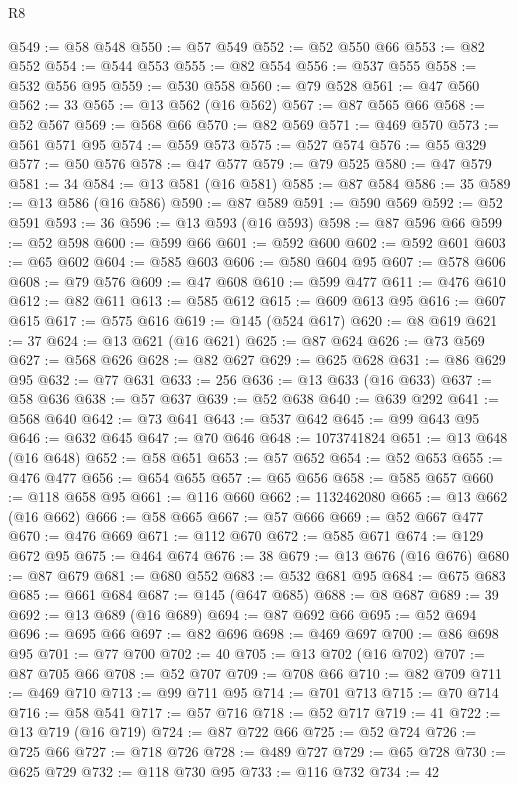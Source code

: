 \begin{lexlean}{R8}
\begin{coremodule}
@549 := @58 @548
@550 := @57 @549
@552 := @52 @550 @66
@553 := @82 @552
@554 := @544 @553
@555 := @82 @554
@556 := @537 @555
@558 := @532 @556 @95
@559 := @530 @558
@560 := @79 @528
@561 := @47 @560
@562 := 33
@565 := @13 @562 (@16 @562)
@567 := @87 @565 @66
@568 := @52 @567
@569 := @568 @66
@570 := @82 @569
@571 := @469 @570
@573 := @561 @571 @95
@574 := @559 @573
@575 := @527 @574
@576 := @55 @329
@577 := @50 @576
@578 := @47 @577
@579 := @79 @525
@580 := @47 @579
@581 := 34
@584 := @13 @581 (@16 @581)
@585 := @87 @584
@586 := 35
@589 := @13 @586 (@16 @586)
@590 := @87 @589
@591 := @590 @569
@592 := @52 @591
@593 := 36
@596 := @13 @593 (@16 @593)
@598 := @87 @596 @66
@599 := @52 @598
@600 := @599 @66
@601 := @592 @600
@602 := @592 @601
@603 := @65 @602
@604 := @585 @603
@606 := @580 @604 @95
@607 := @578 @606
@608 := @79 @576
@609 := @47 @608
@610 := @599 @477
@611 := @476 @610
@612 := @82 @611
@613 := @585 @612
@615 := @609 @613 @95
@616 := @607 @615
@617 := @575 @616
@619 := @145 (@524 @617)
@620 := @8 @619
@621 := 37
@624 := @13 @621 (@16 @621)
@625 := @87 @624
@626 := @73 @569
@627 := @568 @626
@628 := @82 @627
@629 := @625 @628
@631 := @86 @629 @95
@632 := @77 @631
@633 := 256
@636 := @13 @633 (@16 @633)
@637 := @58 @636
@638 := @57 @637
@639 := @52 @638
@640 := @639 @292
@641 := @568 @640
@642 := @73 @641
@643 := @537 @642
@645 := @99 @643 @95
@646 := @632 @645
@647 := @70 @646
@648 := 1073741824
@651 := @13 @648 (@16 @648)
@652 := @58 @651
@653 := @57 @652
@654 := @52 @653
@655 := @476 @477
@656 := @654 @655
@657 := @65 @656
@658 := @585 @657
@660 := @118 @658 @95
@661 := @116 @660
@662 := 1132462080
@665 := @13 @662 (@16 @662)
@666 := @58 @665
@667 := @57 @666
@669 := @52 @667 @477
@670 := @476 @669
@671 := @112 @670
@672 := @585 @671
@674 := @129 @672 @95
@675 := @464 @674
@676 := 38
@679 := @13 @676 (@16 @676)
@680 := @87 @679
@681 := @680 @552
@683 := @532 @681 @95
@684 := @675 @683
@685 := @661 @684
@687 := @145 (@647 @685)
@688 := @8 @687
@689 := 39
@692 := @13 @689 (@16 @689)
@694 := @87 @692 @66
@695 := @52 @694
@696 := @695 @66
@697 := @82 @696
@698 := @469 @697
@700 := @86 @698 @95
@701 := @77 @700
@702 := 40
@705 := @13 @702 (@16 @702)
@707 := @87 @705 @66
@708 := @52 @707
@709 := @708 @66
@710 := @82 @709
@711 := @469 @710
@713 := @99 @711 @95
@714 := @701 @713
@715 := @70 @714
@716 := @58 @541
@717 := @57 @716
@718 := @52 @717
@719 := 41
@722 := @13 @719 (@16 @719)
@724 := @87 @722 @66
@725 := @52 @724
@726 := @725 @66
@727 := @718 @726
@728 := @489 @727
@729 := @65 @728
@730 := @625 @729
@732 := @118 @730 @95
@733 := @116 @732
@734 := 42

\end{coremodule}
\end{lexlean}
